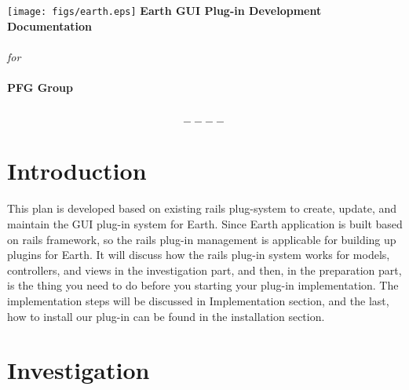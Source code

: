 \documentclass[10pt,oneside]{article}
\begin{document}
\begin{titlepage}
\begin{center}
\texttt{[image: figs/earth.eps]}
\vfill
\textbf{\huge Earth GUI Plug-in Development
Documentation}\\ \textit{} \\ \textit{} 
\textit{for} \\ \textit{} \\ \textit{} 
\textbf{\huge PFG Group}\\ \textit{} \\ \textit{}
\vfill
\end{center}
\end{titlepage}
 


\newpage

\tableofcontents

\[----\]


\listoffigures
 
\newpage

\section{Introduction} 

This plan is developed based on existing rails plug-system to create, update, and maintain the GUI plug-in system for Earth. Since Earth application is built based on rails framework, so the rails plug-in management is applicable for building up plugins for Earth. It will discuss how the rails plug-in system works for models, controllers, and views in the investigation part, and then, in the preparation part, is the thing you need to do before you starting your plug-in implementation. The implementation steps will be discussed in Implementation section, and the last, how to install our plug-in can be found in the installation section.\\

\section{Investigation}
 
\end{document}
